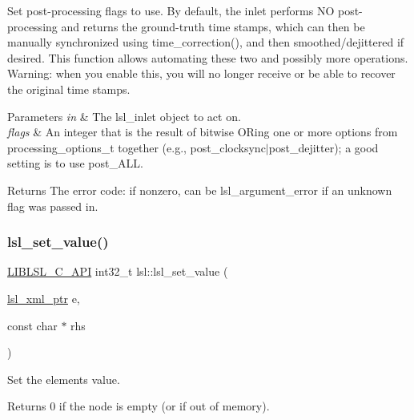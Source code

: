 Set post-\/processing flags to use. By default, the inlet performs NO post-\/processing and returns the ground-\/truth time stamps, which can then be manually synchronized using time\+\_\+correction(), and then smoothed/dejittered if desired. This function allows automating these two and possibly more operations. Warning\+: when you enable this, you will no longer receive or be able to recover the original time stamps. 
\begin{DoxyParams}{Parameters}
{\em in} & The lsl\+\_\+inlet object to act on. \\
\hline
{\em flags} & An integer that is the result of bitwise OR\textquotesingle{}ing one or more options from processing\+\_\+options\+\_\+t together (e.\+g., post\+\_\+clocksync$\vert$post\+\_\+dejitter); a good setting is to use post\+\_\+\+A\+LL. \\
\hline
\end{DoxyParams}
\begin{DoxyReturn}{Returns}
The error code\+: if nonzero, can be lsl\+\_\+argument\+\_\+error if an unknown flag was passed in. 
\end{DoxyReturn}
\mbox{\label{namespacelsl_ab072800f46e425c22568529419a3301b}} 
\subsubsection{\texorpdfstring{lsl\+\_\+set\+\_\+value()}{lsl\_set\_value()}}
{\footnotesize\ttfamily \hyperlink{lsl__cpp_8h_aafd0ef1813e8be84a1420c4f1df64615}{L\+I\+B\+L\+S\+L\+\_\+\+C\+\_\+\+A\+PI} int32\+\_\+t lsl\+::lsl\+\_\+set\+\_\+value (\begin{DoxyParamCaption}\item[{\hyperlink{namespacelsl_a5edc7a49a1a1be1634fe6dce3d59c59b}{lsl\+\_\+xml\+\_\+ptr}}]{e,  }\item[{const char $\ast$}]{rhs }\end{DoxyParamCaption})}

Set the element\textquotesingle{}s value. \begin{DoxyReturn}{Returns}
0 if the node is empty (or if out of memory). 
\end{DoxyReturn}
\mbox{\label{namespacelsl_a71b6f856d04b6519ab6b249499ad4e91}} 
